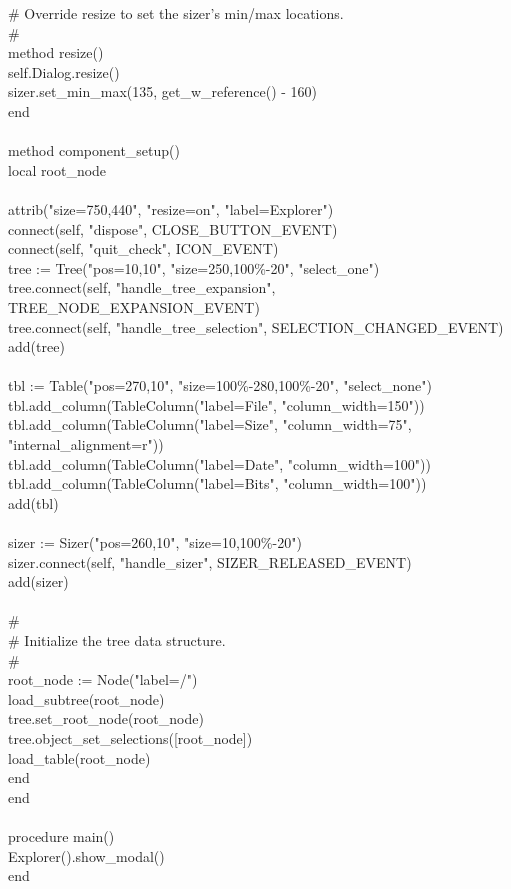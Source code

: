 {\>\# Override resize to set the sizer's min/max locations. \\
\>\# \\
\>method resize() \\
\>\>self.Dialog.resize() \\
\>\>sizer.set\_min\_max(135, get\_w\_reference() - 160) \\
\>end \\
\ \\
\>method component\_setup() \\
\>\>local root\_node \\
\ \\
\>\>attrib("size=750,440", "resize=on", "label=Explorer") \\
\>\>connect(self, "dispose", CLOSE\_BUTTON\_EVENT) \\
\>\>connect(self, "quit\_check", ICON\_EVENT) \\
\>\>tree := Tree("pos=10,10", "size=250,100\%-20", "select\_one") \\
\>\>tree.connect(self, "handle\_tree\_expansion", TREE\_NODE\_EXPANSION\_EVENT) \\
\>\>tree.connect(self, "handle\_tree\_selection", SELECTION\_CHANGED\_EVENT) \\
\>\>add(tree) \\
\ \\
\>\>tbl := Table("pos=270,10", "size=100\%-280,100\%-20", "select\_none") \\
\>\>tbl.add\_column(TableColumn("label=File", "column\_width=150")) \\
\>\>tbl.add\_column(TableColumn("label=Size", "column\_width=75", "internal\_alignment=r")) \\
\>\>tbl.add\_column(TableColumn("label=Date", "column\_width=100")) \\
\>\>tbl.add\_column(TableColumn("label=Bits", "column\_width=100")) \\
\>\>add(tbl) \\
\ \\
\>\>sizer := Sizer("pos=260,10", "size=10,100\%-20") \\
\>\>sizer.connect(self, "handle\_sizer", SIZER\_RELEASED\_EVENT) \\
\>\>add(sizer) \\
\ \\
\>\>\# \\
\>\>\# Initialize the tree data structure. \\
\>\>\# \\
\>\>root\_node := Node("label=/") \\
\>\>load\_subtree(root\_node) \\
\>\>tree.set\_root\_node(root\_node) \\
\>\>tree.object\_set\_selections([root\_node]) \\
\>\>load\_table(root\_node) \\
\>end \\
end \\
\ \\
procedure main() \\
\>Explorer().show\_modal() \\
end
}


